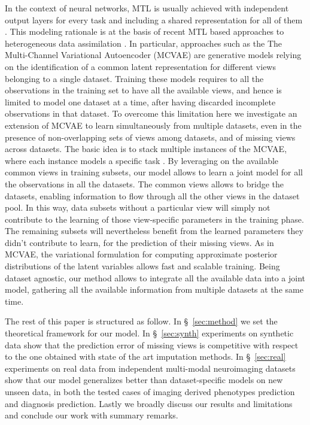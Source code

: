 In the context of neural networks, MTL is usually achieved with independent output layers for every task and including a shared representation for all of them \citep{Dorado-Moreno2020}.
This modeling rationale is at the basis of recent MTL based approaches to heterogeneous data assimilation \citep{Wu2018, Antelmi2019, Shi2019}.
In particular, approaches such as the The Multi-Channel Variational Autoencoder (MCVAE) \citep{Antelmi2019} are generative models relying on the identification of a common latent representation for different views belonging to a single dataset.
Training these models requires to all the observations in the training set to have all the available views, and hence is limited to model one dataset at a time, after having discarded incomplete observations in that dataset.
%
To overcome this limitation here we investigate an extension of MCVAE to learn simultaneously from multiple datasets, even in the presence of non-overlapping sets of views among datasets, and of missing views across datasets.
The basic idea is to stack multiple instances of the MCVAE, where each instance models a specific task .
By leveraging on the available common views in training subsets, our model allows to learn a joint model for all the observations in all the datasets.
The common views allows to bridge the datasets, enabling information to flow through all the other views in the dataset pool.
In this way, data subsets without a particular view will simply not contribute to the learning of those view-specific parameters in the training phase.
The remaining subsets will nevertheless benefit from the learned parameters they didn't contribute to learn, for the prediction of their missing views.
As in MCVAE, the variational formulation for computing approximate posterior distributions of the latent variables allows fast and scalable training.
Being dataset agnostic, our method allows to integrate all the available data into a joint model, gathering  all the available information from multiple datasets at the same time.

The rest of this paper is structured as follow.
In \S~\ref{sec:method} we set the theoretical framework for our model.
In \S~\ref{sec:synth} experiments on synthetic data show that the prediction error of missing views is competitive with respect to the one obtained with state of the art imputation methods.
In \S~\ref{sec:real} experiments on real data from independent multi-modal neuroimaging datasets show that our model generalizes better than dataset-specific models on new unseen data, in both the tested cases of imaging derived phenotypes prediction and diagnosis prediction.
Lastly we broadly discuss our results and limitations and conclude our work with summary remarks.
